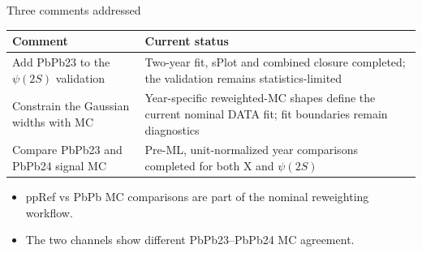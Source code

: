 \begin{frame}[label=p2]{Three comments addressed}
  \vspace{2pt}
  \begin{center}
    \renewcommand{\arraystretch}{1.25}
    \begin{tabular}{p{}p{}}
      \toprule
      Comment & Current status \\
      \midrule
      {\raggedright Add PbPb23 to the $\psi(2S)$ validation\par}
        & {\raggedright Two-year fit, sPlot and combined closure completed; the validation remains statistics-limited\par} \\
      {\raggedright Constrain the Gaussian widths with MC\par}
        & {\raggedright Year-specific reweighted-MC shapes define the current nominal DATA fit; fit boundaries remain diagnostics\par} \\
      {\raggedright Compare PbPb23 and PbPb24 signal MC\par}
        & {\raggedright Pre-ML, unit-normalized year comparisons completed for both X and $\psi(2S)$\par} \\
      \bottomrule
    \end{tabular}
  \end{center}

  \vspace{0.45em}
  \begin{itemize}
    \setlength{\itemsep}{0.2em}
    \item ppRef vs PbPb MC comparisons are part of the nominal reweighting workflow.
    \item The two channels show different PbPb23--PbPb24 MC agreement.
  \end{itemize}
\end{frame}

